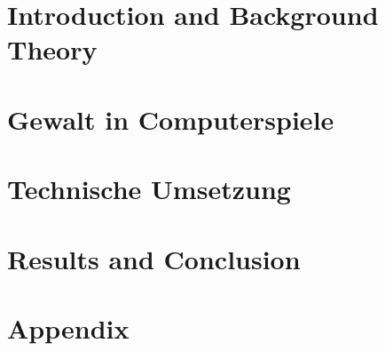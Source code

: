 
\addtolength{\evensidemargin}{-12mm}

%
%
\part[Introduction and Background Theory]{Introduction and Background Theory}
\label{part:introAndBackgroundTheory}




%
\part[Gewalt in Computerspiele]{Gewalt in Computerspiele}
\label{part:violenceInComputerGames}





%
\part[Technische Umsetzung]{Technische Umsetzung}
\label{part:technicalRealisation}




\part[Results and Conclusion]{Results and Conclusion}
\label{part:resultsAndConclusion}
 


%
%

\part*{Appendix}

\appendix %


